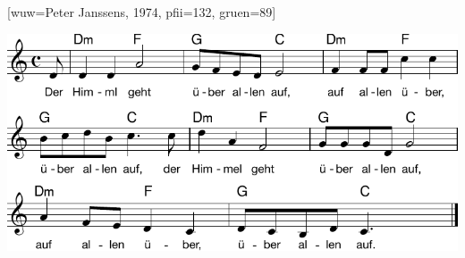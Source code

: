 [wuw={Peter Janssens, 1974}, pfii={132}, gruen={89}]

\markboth{\songtitle}{\songtitle}

\beginverse
\endverse

\centering\includegraphics[width=1\textwidth]{Noten/Lied107a.pdf}

\endsong

\beginscripture

\endscripture

\begin{intersong}

\end{intersong}